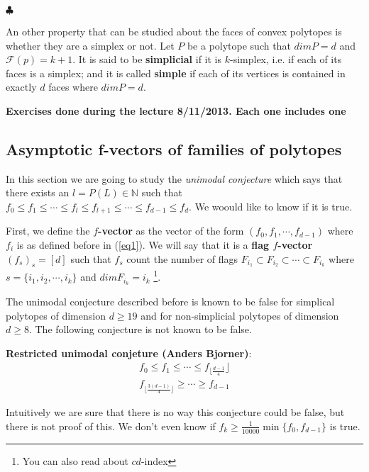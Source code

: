 \begin{flushright}
$\clubsuit$
\end{flushright}

\bigskip

An other property that can be studied about the faces of convex polytopes is whether they are a simplex or not. Let $P$ be a polytope such that $dim P = d$ and $\mathcal{F}(p) = k+1$. It is said to be \textbf{simplicial} if it is $k$-simplex, i.e. if each of its faces is a simplex; and it is called \textbf{simple} if each of its vertices is contained in exactly $d$ faces where $dim P =d$.

\bigskip
\textbf{Exercises done during the lecture 8/11/2013. Each one includes one}


\subsection{Asymptotic f-vectors of families of polytopes}

In this section we are going to study the \textit{unimodal conjecture} which says that there exists an $l = P(L)\in\mathbb{N}$ such that $f_0\leq f_1 \leq \cdots\leq f_l \leq f_{l+1}\leq \cdots \leq f_{d-1}\leq f_d$. We woould like to know if it is true. 

First, we define the \textbf{$f$-vector} as the vector of the form $(f_0,f_{1},\cdots,f_{d-1})$ where $f_i$ is as defined before in (\ref{eq1}). We will say that it is a \textbf{flag $f$-vector} $(f_s)_s = [d]$ such that $f_s$ count the number of flags $F_{i_1} \subset F_{i_2} \subset \cdots \subset F_{i_k}$ where $s = \{i_1,i_2,\cdots, i_k \}$ and $dim F_{i_k} = i_k$ \footnote{You can also read about $cd$-index}.

\bigskip
The unimodal conjecture described before is known to be false for simplical polytopes of dimension $d\geq 19$ and for non-simplicial polytopes of dimension $d \geq 8$. The following conjecture is not known to be false. 

\textbf{Restricted unimodal conjeture (Anders Bjorner)}: 
\begin{eqnarray*}
 f_0\leq f_1\leq \cdots \leq f_{\lfloor \frac{d-1}{4}}\rfloor\\
 f_{\lfloor \frac{3(d-1)}{4}\rfloor}\geq \cdots \geq f_{d-1}
\end{eqnarray*} 

Intuitively we are sure that there is no way this conjecture could be false, but there is not proof of this. We don't even know if $f_k\geq \frac{1}{10000}\min\{f_0,f_{d-1}\}$ is true.

